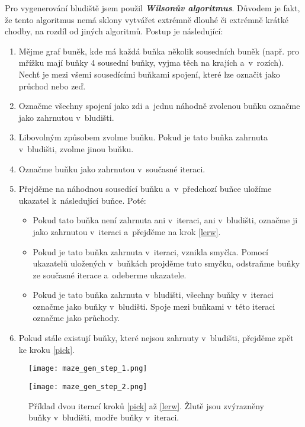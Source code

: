 Pro vygenerování bludiště jsem použil \textit{\textbf{Wilsonův algoritmus}}. Důvodem je fakt, že tento algoritmus nemá sklony vytvářet extrémně dlouhé či extrémně krátké chodby, na rozdíl od jiných algoritmů. Postup je následující: \cite{enwiki:1193338583}

\begin{enumerate}
  \setcounter{enumi}{0}
  \item Mějme graf buněk, kde má každá buňka několik sousedních buněk (např. pro mřížku mají buňky 4 sousední buňky, vyjma těch na krajích a~v~rozích). Nechť je mezi všemi sousedícími buňkami spojení, které lze označit jako průchod nebo zeď.
  \item Označme všechny spojení jako zdi a~jednu náhodně zvolenou buňku označme jako zahrnutou v~bludišti. \label{init}
  \item Libovolným způsobem zvolme buňku. Pokud je tato buňka zahrnuta v~bludišti, zvolme jinou buňku. \label{pick}
  \item Označme buňku jako zahrnutou v~současné iteraci.
  \item Přejděme na náhodnou sousedící buňku a~v~předchozí buňce uložíme ukazatel k~následující buňce. Poté: \label{lerw}
        \begin{itemize}
          \item Pokud tato buňka není zahrnuta ani v~iteraci, ani v~bludišti, označme ji jako zahrnutou v~iteraci a~přejděme na krok \ref{lerw}.
          \item Pokud je tato buňka zahrnuta v~iteraci, vznikla smyčka. Pomocí ukazatelů uložených v~buňkách projděme tuto smyčku, odstraňme buňky ze současné iterace a~odeberme ukazatele.
          \item Pokud je tato buňka zahrnuta v~bludišti, všechny buňky v~iteraci označme jako buňky v~bludišti. Spoje mezi buňkami v~této iteraci označme jako průchody.
        \end{itemize}
  \item Pokud stále existují buňky, které nejsou zahrnuty v~bludišti, přejděme zpět ke kroku \ref{pick}.
\end{enumerate}

\begin{figure}[H]
  \centering

  \begin{minipage}{.5\textwidth}
    \centering
    \texttt{[image: maze\_gen\_step\_1.png]}
  \end{minipage}%
  \begin{minipage}{.5\textwidth}
    \centering
    \texttt{[image: maze\_gen\_step\_2.png]}
  \end{minipage}

  \caption{Příklad dvou iterací kroků \ref{pick} až \ref{lerw}. Žlutě jsou zvýrazněny buňky v~bludišti, modře buňky v~iteraci.}
\end{figure}

